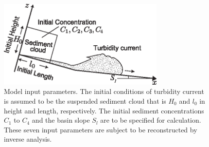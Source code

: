 \begin{figure}[t]
  \includegraphics[width=8.3cm]{fig03.eps}
  \caption{Model input parameters. The initial conditions of turbidity current is assumed to be the suspended sediment cloud that is $H_0$ and $l_0$ in height and length, respectively. The initial sediment concentrations $C_1$ to $C_4$ and the basin slope $S_l$ are to be specified for calculation. These seven input parameters are subject to be reconstructed by inverse analysis.}
  \label{fig:model_input_parameters}
\end{figure}
